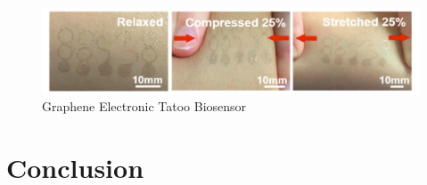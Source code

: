 \documentclass[sigconf]{acmart}
\begin{document}
\begin{figure}[!ht]
  \centering\includegraphics[width=\columnwidth]{images/Figure7.pdf}
  \caption{Graphene Electronic Tatoo Biosensor \cite{ameri17}
  }\label{f:Figure7}
\end{figure}

\section{Conclusion}
\end{document}
